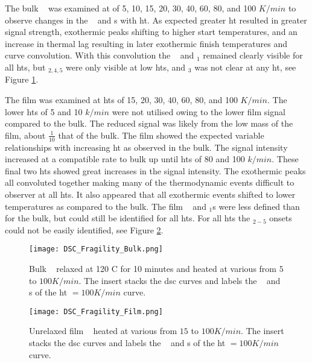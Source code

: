 \documentclass[draft,a4paper,12pt,oneside]{article}%
\begin{document}
The bulk \MgZnCa~ was examined at  of 5, 10, 15, 20, 30, 40, 60, 80, and 100 $K/min$ to observe changes in the \Tg~ and \Tx s with \gls{ht}. As expected greater \gls{ht} resulted in greater signal strength, exothermic peaks shifting to higher start temperatures, and an increase in thermal lag resulting in later exothermic finish temperatures and curve convolution. With this convolution the \Tg~ and \Tx $_{1}$  remained clearly visible for all \glspl{ht}, but \Tx $_{2,4,5}$ were only visible at low \glspl{ht}, and \Tx $_{3}$ was not clear at any \gls{ht}, see Figure \ref{fig:DSC_vHeatingRate_Bulk}.

The film was examined at \glspl{ht} of 15, 20, 30, 40, 60, 80, and 100 $K/min$. The lower \glspl{ht} of 5 and 10 $k/min$ were not utilised owing to the lower film signal compared to the bulk. The reduced signal was likely from the low mass of the film, about $\frac{1}{10}$ that of the bulk. The film showed the expected variable relationships with increasing \gls{ht} as observed in the bulk. The signal intensity increased at a compatible rate to bulk up until \glspl{ht} of 80 and 100 $k/min$. These final two \glspl{ht} showed great increases in the signal intensity. The exothermic peaks all convoluted together making many of the thermodynamic events difficult to observer at all \glspl{ht}. It also appeared that all exothermic events shifted to lower temperatures as compared to the bulk. The film \Tg~ and \Tx $_{1}$s were less defined than for the bulk, but could still be identified for all \glspl{ht}. For all \glspl{ht} the \Tx $_{2-5}$ onsets could not be easily identified, see Figure \ref{fig:DSC_vHeatingRate_Film}.

\begin{figure}[b]
	\centering
	\texttt{[image: DSC\_Fragility\_Bulk.png]}
	\caption{Bulk \MgZnCa~ relaxed at 120 \degree C for 10 minutes and heated at various  from $5$ to $100 K/min$. The insert stacks the \gls{dsc} curves and labels the \Tg~ and \Tx s of the \gls{ht} $=100 K/min$ curve.}%
	\label{fig:DSC_vHeatingRate_Bulk}
\end{figure}

\begin{figure}[b]
	\centering
	\texttt{[image: DSC\_Fragility\_Film.png]}
	\caption{Unrelaxed film \MgZnCa~ heated at various   from $15$ to $100 K/min$. The insert stacks the \gls{dsc} curves and labels the \Tg~ and \Tx s of the \gls{ht} $=100 K/min$ curve.}%
	\label{fig:DSC_vHeatingRate_Film}
\end{figure}
\end{document}
